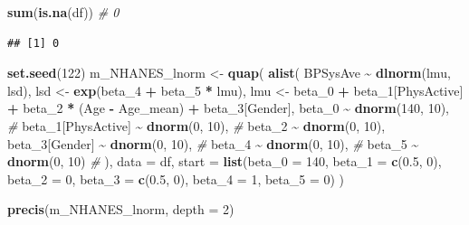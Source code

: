 \documentclass[
]{book}
\newenvironment{Shaded}{\begin{snugshade}}{\end{snugshade}}
\newcommand{\AttributeTok}[1]{\textcolor[rgb]{0.13,0.29,0.53}{#1}}
\newcommand{\CommentTok}[1]{\textcolor[rgb]{0.56,0.35,0.01}{\textit{#1}}}
\newcommand{\DecValTok}[1]{\textcolor[rgb]{0.00,0.00,0.81}{#1}}
\newcommand{\FloatTok}[1]{\textcolor[rgb]{0.00,0.00,0.81}{#1}}
\newcommand{\FunctionTok}[1]{\textcolor[rgb]{0.13,0.29,0.53}{\textbf{#1}}}
\newcommand{\NormalTok}[1]{#1}
\newcommand{\OtherTok}[1]{\textcolor[rgb]{0.56,0.35,0.01}{#1}}
\newcommand{\SpecialCharTok}[1]{\textcolor[rgb]{0.81,0.36,0.00}{\textbf{#1}}}
\begin{document}
\begin{Shaded}
\begin{Highlighting}[]
\FunctionTok{sum}\NormalTok{(}\FunctionTok{is.na}\NormalTok{(df)) }\CommentTok{\# 0}
\end{Highlighting}
\end{Shaded}

\begin{verbatim}
## [1] 0
\end{verbatim}

\begin{Shaded}
\begin{Highlighting}[]
\FunctionTok{set.seed}\NormalTok{(}\DecValTok{122}\NormalTok{)}
\NormalTok{m\_NHANES\_lnorm }\OtherTok{\textless{}{-}} \FunctionTok{quap}\NormalTok{(}
  \FunctionTok{alist}\NormalTok{(}
\NormalTok{    BPSysAve }\SpecialCharTok{\textasciitilde{}} \FunctionTok{dlnorm}\NormalTok{(lmu, lsd), }
\NormalTok{    lsd }\OtherTok{\textless{}{-}} \FunctionTok{exp}\NormalTok{(beta\_4 }\SpecialCharTok{+}\NormalTok{ beta\_5 }\SpecialCharTok{*}\NormalTok{ lmu),}
\NormalTok{    lmu }\OtherTok{\textless{}{-}}\NormalTok{ beta\_0 }\SpecialCharTok{+}\NormalTok{ beta\_1[PhysActive] }\SpecialCharTok{+}\NormalTok{ beta\_2 }\SpecialCharTok{*}\NormalTok{ (Age }\SpecialCharTok{{-}}\NormalTok{ Age\_mean) }\SpecialCharTok{+}\NormalTok{ beta\_3[Gender],}
\NormalTok{    beta\_0 }\SpecialCharTok{\textasciitilde{}} \FunctionTok{dnorm}\NormalTok{(}\DecValTok{140}\NormalTok{, }\DecValTok{10}\NormalTok{),  }\CommentTok{\# }
\NormalTok{    beta\_1[PhysActive] }\SpecialCharTok{\textasciitilde{}} \FunctionTok{dnorm}\NormalTok{(}\DecValTok{0}\NormalTok{, }\DecValTok{10}\NormalTok{),  }\CommentTok{\# }
\NormalTok{    beta\_2 }\SpecialCharTok{\textasciitilde{}} \FunctionTok{dnorm}\NormalTok{(}\DecValTok{0}\NormalTok{, }\DecValTok{10}\NormalTok{),}
\NormalTok{    beta\_3[Gender] }\SpecialCharTok{\textasciitilde{}} \FunctionTok{dnorm}\NormalTok{(}\DecValTok{0}\NormalTok{, }\DecValTok{10}\NormalTok{),  }\CommentTok{\# }
\NormalTok{    beta\_4 }\SpecialCharTok{\textasciitilde{}} \FunctionTok{dnorm}\NormalTok{(}\DecValTok{0}\NormalTok{, }\DecValTok{10}\NormalTok{),  }\CommentTok{\# }
\NormalTok{    beta\_5 }\SpecialCharTok{\textasciitilde{}} \FunctionTok{dnorm}\NormalTok{(}\DecValTok{0}\NormalTok{, }\DecValTok{10}\NormalTok{)  }\CommentTok{\#}
\NormalTok{  ),}
  \AttributeTok{data =}\NormalTok{ df,}
  \AttributeTok{start =} \FunctionTok{list}\NormalTok{(}\AttributeTok{beta\_0 =} \DecValTok{140}\NormalTok{, }\AttributeTok{beta\_1 =} \FunctionTok{c}\NormalTok{(}\FloatTok{0.5}\NormalTok{, }\DecValTok{0}\NormalTok{), }\AttributeTok{beta\_2 =} \DecValTok{0}\NormalTok{, }\AttributeTok{beta\_3 =} \FunctionTok{c}\NormalTok{(}\FloatTok{0.5}\NormalTok{, }\DecValTok{0}\NormalTok{), }\AttributeTok{beta\_4 =} \DecValTok{1}\NormalTok{, }\AttributeTok{beta\_5 =} \DecValTok{0}\NormalTok{)}
\NormalTok{)}

\FunctionTok{precis}\NormalTok{(m\_NHANES\_lnorm, }\AttributeTok{depth =} \DecValTok{2}\NormalTok{)}
\end{Highlighting}
\end{Shaded}
\end{document}
